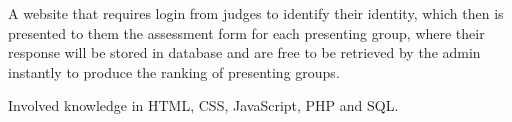 \documentclass[letterpaper]{deedy-resume} %
\begin{document}
\begin{minipage}[t]{0.66\textwidth}
\vspace{\topsep}
\begin{tightitemize}
\item A website that requires login from judges to identify their identity, which then is presented to them the assessment form for each presenting group, 
where their response will be stored in database and are free to be retrieved by the admin instantly to produce the ranking of presenting groups.
\item Involved knowledge in HTML, CSS, JavaScript, PHP and SQL.
\end{tightitemize} 
\sectionspace %

\end{minipage}
\end{document}
